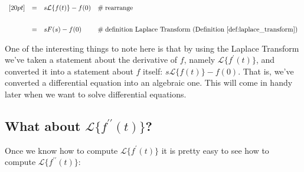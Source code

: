 \documentclass{article}
\theoremstyle{definition}
\begin{document}
\begin{equation*}
\begin{array}{lllll}
[20pt]                                                                                                                                                                                              %
&=& s \mathcal{L}\{f(t)\} - f(0)                                                                                                                                                         &\mathrel{\#} \text{rearrange}        \\
[20pt]                                                                                                                                                                                              %
&=& s F(s) - f(0)                                   &\mathrel{\#} \text{definition Laplace Transform (Definition \ref{def:laplace_transform})} \\                                                                                                                                                                                                                                                                        
\end{array}
\end{equation*}

\bigskip
\noindent
One of the interesting things to note here is that by using the Laplace Transform we've taken a statement about the derivative of $f$, namely $\mathcal{L}\{f^\prime(t)\}$,
and converted it into a statement about $f$ itself: $s \mathcal{L}\{f(t)\} - f(0)$. That is, we've converted a differential equation into an algebraic one. This will come in handy later 
when we want to solve differential equations.

\newpage
\subsection{What about $\mathcal{L}\{f^{\prime\prime}(t)\}$?}
\label{eqn:f_double_prime}

\bigskip
\noindent
Once we know how to compute $\mathcal{L}\{f^{\prime}(t)\}$ it is pretty easy to see how to compute $\mathcal{L}\{f^{\prime\prime}(t)\}$:
\end{document}
